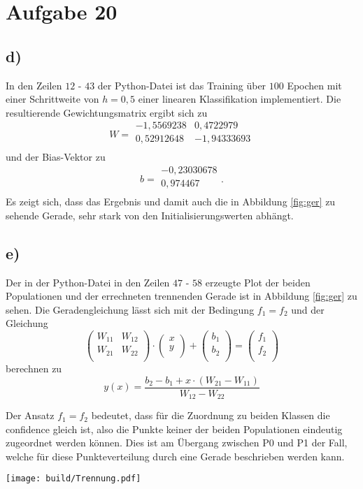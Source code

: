 \section*{Aufgabe 20}
\label{sec:Aufgabe2}

\newpage
\subsection*{d)}
In den Zeilen $12$ - $43$ der Python-Datei ist das Training über $100$ Epochen mit einer Schrittweite von $h=0,5$ einer linearen Klassifikation implementiert.
Die resultierende Gewichtungsmatrix ergibt sich zu
\[
W = \begin{matrix}
-1,5569238 & 0,4722979 \\
0,52912648 & -1,94333693 \\
\end{matrix}
\]
und der Bias-Vektor zu
\[
b = \begin{matrix}
-0,23030678 \\
0,974467 \\
\end{matrix}\text{.}
\]
Es zeigt sich, dass das Ergebnis und damit auch die in Abbildung \ref{fig:ger} zu sehende Gerade, sehr stark von den Initialisierungswerten abhängt.

\subsection*{e)}
Der in der Python-Datei in den Zeilen $47$ - $58$ erzeugte Plot der beiden Populationen und der errechneten trennenden Gerade ist in Abbildung \ref{fig:ger} zu sehen.
Die Geradengleichung lässt sich mit der Bedingung $f_\text{1}=f_\text{2}$
und der Gleichung
\[
  \begin{pmatrix}
    W_{11} & W_{12} \\
    W_{21} & W_{22} \\
  \end{pmatrix}
  \cdot
  \begin{pmatrix}
    x \\
    y \\
  \end{pmatrix}
   +
  \begin{pmatrix}
    b_1 \\
    b_2 \\
  \end{pmatrix}
   =
  \begin{pmatrix}
    f_1 \\
    f_2 \\
  \end{pmatrix}
\]
berechnen zu 
\[
y(x)=\frac{b_2-b_1+ x \cdot (W_{21}-W_{11})}{W_{12}-W_{22}}
\]

Der Ansatz $f_\text{1}=f_\text{2}$ bedeutet, dass für die Zuordnung zu beiden Klassen die confidence gleich ist, also die Punkte keiner der beiden Populationen eindeutig zugeordnet werden können.
Dies ist am Übergang zwischen P0 und P1 der Fall, welche für diese Punkteverteilung durch eine Gerade beschrieben werden kann.

\texttt{[image: build/Trennung.pdf]}